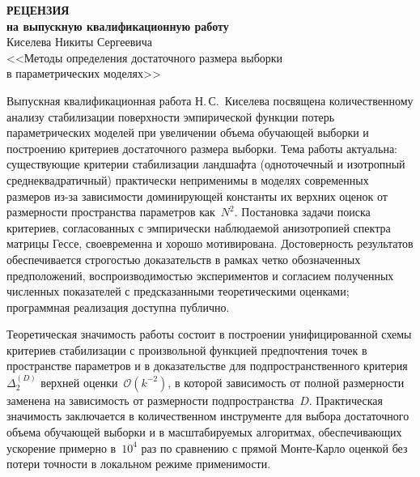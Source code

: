 \documentclass[11pt,a4paper]{extarticle}
\begin{document}
\pagestyle{empty}

\begin{center}
  \textbf{РЕЦЕНЗИЯ}\\
  \textbf{на выпускную квалификационную работу}\\
  Киселева Никиты Сергеевича\\
  <<Методы определения достаточного размера выборки\\ в параметрических моделях>>
\end{center}

\vspace{0.3em}

Выпускная квалификационная работа Н.\,С.~Киселева посвящена количественному анализу стабилизации поверхности эмпирической функции потерь параметрических моделей при увеличении объема обучающей выборки и построению критериев достаточного размера выборки. Тема работы актуальна: существующие критерии стабилизации ландшафта (одноточечный и изотропный среднеквадратичный) практически неприменимы в моделях современных размеров из-за зависимости доминирующей константы их верхних оценок от размерности пространства параметров как~${N^2}$. Постановка задачи поиска критериев, согласованных с эмпирически наблюдаемой анизотропией спектра матрицы Гессе, своевременна и хорошо мотивирована. Достоверность результатов обеспечивается строгостью доказательств в рамках четко обозначенных предположений, воспроизводимостью экспериментов и согласием полученных численных показателей с предсказанными теоретическими оценками; программная реализация доступна публично.

Теоретическая значимость работы состоит в построении унифицированной схемы критериев стабилизации с произвольной функцией предпочтения точек в пространстве параметров и в доказательстве для подпространственного критерия~${\Delta_2^{(D)}}$ верхней оценки~${\mathcal O(k^{-2})}$, в которой зависимость от полной размерности заменена на зависимость от размерности подпространства~${D}$. Практическая значимость заключается в количественном инструменте для выбора достаточного объема обучающей выборки и в масштабируемых алгоритмах, обеспечивающих ускорение примерно в~${10^4}$ раз по сравнению с прямой Монте-Карло оценкой без потери точности в локальном режиме применимости.
\end{document}

